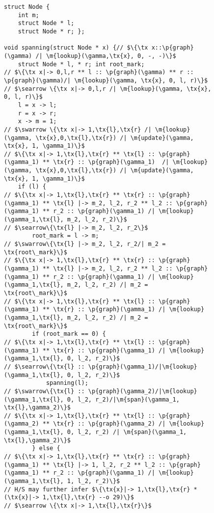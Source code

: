 \documentclass{article}
\newcommand{\tx}[1]{\text{#1}}
\newcommand{\p}[1]{\ensuremath{\mathsf{#1}}} %
\newcommand{\m}[1]{\ensuremath{\mathit{#1}}} %
\begin{document}
\begin{figure}[htbp]
\begin{lstlisting}
struct Node {
    int m;
    struct Node * l;
    struct Node * r; };

void spanning(struct Node * x) {// $\{\tx x::\p{graph}(\gamma) /| \m{lookup}(\gamma,\tx{x}, 0, -, -)\}$
    struct Node * l, * r; int root_mark;
// $\{\tx x|-> 0,l,r ** l :: \p{graph}(\gamma) ** r :: \p{graph}(\gamma)/| \m{lookup}(\gamma, \tx{x}, 0, l, r)\}$
// $\searrow \{\tx x|-> 0,l,r /| \m{lookup}(\gamma, \tx{x}, 0, l, r)\}$
    l = x -> l;
    r = x -> r;
    x -> m = 1;
// $\swarrow \{\tx x|-> 1,\tx{l},\tx{r} /| \m{lookup}(\gamma, \tx{x},0,\tx{l},\tx{r}) /| \m{update}(\gamma, \tx{x}, 1, \gamma_1)\}$
// $\{\tx x|-> 1,\tx{l},\tx{r} ** \tx{l} :: \p{graph}(\gamma_1) ** \tx{r} :: \p{graph}(\gamma_1)  /| \m{lookup}(\gamma, \tx{x},0,\tx{l},\tx{r}) /| \m{update}(\gamma, \tx{x}, 1, \gamma_1)\}$
    if (l) {
// $\{\tx x|-> 1,\tx{l},\tx{r} ** \tx{r} :: \p{graph}(\gamma_1) ** \tx{l} |-> m_2, l_2, r_2 ** l_2 :: \p{graph}(\gamma_1) ** r_2 :: \p{graph}(\gamma_1) /| \m{lookup}(\gamma_1,\tx{l}, m_2, l_2, r_2)\}$
// $\searrow\{\tx{l} |-> m_2, l_2, r_2\}$
        root_mark = l -> m;
// $\swarrow\{\tx{l} |-> m_2, l_2, r_2/| m_2 = \tx{root\_mark}\}$
// $\{\tx x|-> 1,\tx{l},\tx{r} ** \tx{r} :: \p{graph}(\gamma_1) ** \tx{l} |-> m_2, l_2, r_2 ** l_2 :: \p{graph}(\gamma_1) ** r_2 :: \p{graph}(\gamma_1) /| \m{lookup}(\gamma_1,\tx{l}, m_2, l_2, r_2) /| m_2 = \tx{root\_mark}\}$
// $\{\tx x|-> 1,\tx{l},\tx{r} ** \tx{l} :: \p{graph}(\gamma_1) ** \tx{r} :: \p{graph}(\gamma_1) /| \m{lookup}(\gamma_1,\tx{l}, m_2, l_2, r_2) /| m_2 = \tx{root\_mark}\}$
        if (root_mark == 0) {
// $\{\tx x|-> 1,\tx{l},\tx{r} ** \tx{l} :: \p{graph}(\gamma_1) ** \tx{r} :: \p{graph}(\gamma_1) /| \m{lookup}(\gamma_1,\tx{l}, 0, l_2, r_2)\}$
// $\searrow\{\tx{l} :: \p{graph}(\gamma_1)/|\m{lookup}(\gamma_1,\tx{l}, 0, l_2, r_2)\}$
            spanning(l);
// $\swarrow\{\tx{l} :: \p{graph}(\gamma_2)/|\m{lookup}(\gamma_1,\tx{l}, 0, l_2, r_2)/|\m{span}(\gamma_1, \tx{l},\gamma_2)\}$
// $\{\tx x|-> 1,\tx{l},\tx{r} ** \tx{l} :: \p{graph}(\gamma_2) ** \tx{r} :: \p{graph}(\gamma_2) /| \m{lookup}(\gamma_1,\tx{l}, 0, l_2, r_2) /| \m{span}(\gamma_1, \tx{l},\gamma_2)\}$
        } else {
// $\{\tx x|-> 1,\tx{l},\tx{r} ** \tx{r} :: \p{graph}(\gamma_1) ** \tx{l} |-> 1, l_2, r_2 ** l_2 :: \p{graph}(\gamma_1) ** r_2 :: \p{graph}(\gamma_1) /| \m{lookup}(\gamma_1,\tx{l}, 1, l_2, r_2)\}$
// H/S may further infer $\{\tx{x}|-> 1,\tx{l},\tx{r} * (\tx{x}|-> 1,\tx{l},\tx{r} --o 29)\}$
// $\searrow \{\tx x|-> 1,\tx{l},\tx{r}\}$

\end{lstlisting}
\end{figure}
\end{document}
